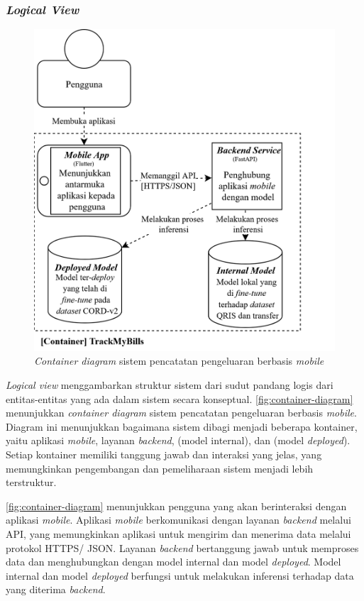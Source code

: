
\subsubsection{\emph{Logical View}}
\label{subsubsec:logical-view}

\begin{figure}[htbp]
    \centering
    \includegraphics[width=.8\textwidth]{images/container-diagram.png}
    \caption{\emph{Container diagram} sistem pencatatan pengeluaran berbasis \emph{mobile}}
    \label{fig:container-diagram}
\end{figure}

\emph{Logical view} menggambarkan struktur sistem dari sudut pandang logis dari entitas-entitas yang ada dalam sistem secara konseptual. \autoref{fig:container-diagram} menunjukkan \emph{container diagram} sistem pencatatan pengeluaran berbasis \emph{mobile}. Diagram ini menunjukkan bagaimana sistem dibagi menjadi beberapa kontainer, yaitu aplikasi \emph{mobile}, layanan \emph{backend}, \donutqristf{} (model internal), dan \donutcord{} (model \emph{deployed}). Setiap kontainer memiliki tanggung jawab dan interaksi yang jelas, yang memungkinkan pengembangan dan pemeliharaan sistem menjadi lebih terstruktur.

\autoref{fig:container-diagram} menunjukkan pengguna yang akan berinteraksi dengan aplikasi \emph{mobile}. Aplikasi \emph{mobile} berkomunikasi dengan layanan \emph{backend} melalui API, yang memungkinkan aplikasi untuk mengirim dan menerima data melalui protokol HTTPS/ JSON. Layanan \emph{backend} bertanggung jawab untuk memproses data dan menghubungkan dengan model internal dan model \emph{deployed}. Model internal dan model \emph{deployed} berfungsi untuk melakukan inferensi terhadap data yang diterima \emph{backend}.


